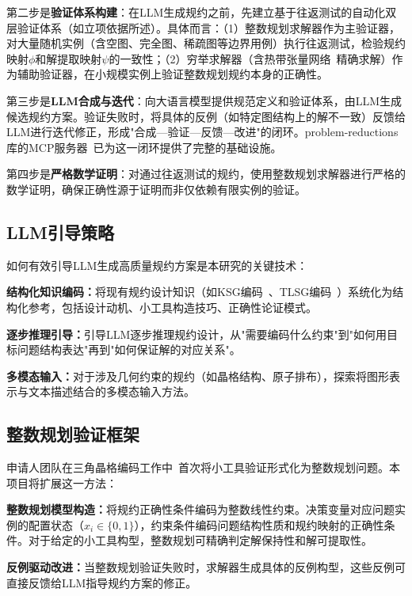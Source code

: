 第二步是\textbf{验证体系构建}：在LLM生成规约之前，先建立基于往返测试的自动化双层验证体系（如立项依据所述）。具体而言：（1）整数规划求解器作为主验证器，对大量随机实例（含空图、完全图、稀疏图等边界用例）执行往返测试，检验规约映射$\phi$和解提取映射$\psi$的一致性；（2）穷举求解器（含热带张量网络~\cite{Liu2021PRL}精确求解）作为辅助验证器，在小规模实例上验证整数规划规约本身的正确性。

第三步是\textbf{LLM合成与迭代}：向大语言模型提供规范定义和验证体系，由LLM生成候选规约方案。验证失败时，将具体的反例（如特定图结构上的解不一致）反馈给LLM进行迭代修正，形成"合成—验证—反馈—改进"的闭环。problem-reductions库的MCP服务器~\cite{ProblemReductions2025}已为这一闭环提供了完整的基础设施。

第四步是\textbf{严格数学证明}：对通过往返测试的规约，使用整数规划求解器进行严格的数学证明，确保正确性源于证明而非仅依赖有限实例的验证。

\subsection{LLM引导策略}

如何有效引导LLM生成高质量规约方案是本研究的关键技术：

\textbf{结构化知识编码：}将现有规约设计知识（如KSG编码~\cite{Nguyen2023PRXQuantum}、TLSG编码~\cite{Pan2025Triangular}）系统化为结构化参考，包括设计动机、小工具构造技巧、正确性论证模式。

\textbf{逐步推理引导：}引导LLM逐步推理规约设计，从"需要编码什么约束"到"如何用目标问题结构表达"再到"如何保证解的对应关系"。

\textbf{多模态输入：}对于涉及几何约束的规约（如晶格结构、原子排布），探索将图形表示与文本描述结合的多模态输入方法。

\subsection{整数规划验证框架}

申请人团队在三角晶格编码工作中~\cite{Pan2025Triangular}首次将小工具验证形式化为整数规划问题。本项目将扩展这一方法：

\textbf{整数规划模型构造：}将规约正确性条件编码为整数线性约束。决策变量对应问题实例的配置状态（$x_i \in \{0, 1\}$），约束条件编码问题结构性质和规约映射的正确性条件。对于给定的小工具构型，整数规划可精确判定解保持性和解可提取性。

\textbf{反例驱动改进：}当整数规划验证失败时，求解器生成具体的反例构型，这些反例可直接反馈给LLM指导规约方案的修正。

